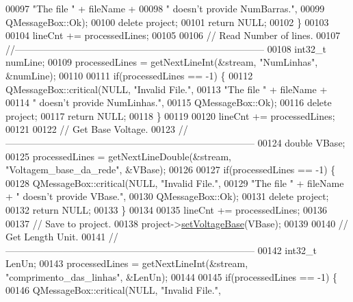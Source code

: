 \begin{DoxyCode}
00097                           \textcolor{stringliteral}{"The file "} + fileName +
00098                           \textcolor{stringliteral}{" doesn't provide NumBarras."},
00099                           QMessageBox::Ok);
00100     \textcolor{keyword}{delete} project;
00101     \textcolor{keywordflow}{return} NULL;
00102   \}
00103 
00104   lineCnt += processedLines;
00105 
00106 \textcolor{comment}{// Read Number of lines.}
00107 \textcolor{comment}{//------------------------------------------------------------------------------}
00108   int32\_t numLine;
00109   processedLines = getNextLineInt(&stream, \textcolor{stringliteral}{"NumLinhas"}, &numLine);
00110 
00111   \textcolor{keywordflow}{if}(processedLines == -1) \{
00112     QMessageBox::critical(NULL, \textcolor{stringliteral}{"Invalid File."},
00113                           \textcolor{stringliteral}{"The file "} + fileName +
00114                           \textcolor{stringliteral}{" doesn't provide NumLinhas."},
00115                           QMessageBox::Ok);
00116     \textcolor{keyword}{delete} project;
00117     \textcolor{keywordflow}{return} NULL;
00118   \}
00119 
00120   lineCnt += processedLines;
00121 
00122 \textcolor{comment}{// Get Base Voltage.}
00123 \textcolor{comment}{//------------------------------------------------------------------------------}
00124   \textcolor{keywordtype}{double} VBase;
00125   processedLines = getNextLineDouble(&stream, \textcolor{stringliteral}{"Voltagem\_base\_da\_rede"}, &VBase);
00126 
00127   \textcolor{keywordflow}{if}(processedLines == -1) \{
00128     QMessageBox::critical(NULL, \textcolor{stringliteral}{"Invalid File."},
00129                           \textcolor{stringliteral}{"The file "} + fileName + \textcolor{stringliteral}{" doesn't provide VBase."},
00130                           QMessageBox::Ok);
00131     \textcolor{keyword}{delete} project;
00132     \textcolor{keywordflow}{return} NULL;
00133   \}
00134 
00135   lineCnt += processedLines;
00136 
00137 \textcolor{comment}{// Save to project.}
00138   project->\hyperlink{class_project_a494c3e89851f754188c7abaedbf77ef6}{setVoltageBase}(VBase);
00139 
00140 \textcolor{comment}{// Get Length Unit.}
00141 \textcolor{comment}{//------------------------------------------------------------------------------}
00142   int32\_t LenUn;
00143   processedLines = getNextLineInt(&stream, \textcolor{stringliteral}{"comprimento\_das\_linhas"}, &LenUn);
00144 
00145   \textcolor{keywordflow}{if}(processedLines == -1) \{
00146     QMessageBox::critical(NULL, \textcolor{stringliteral}{"Invalid File."},

\end{DoxyCode}
